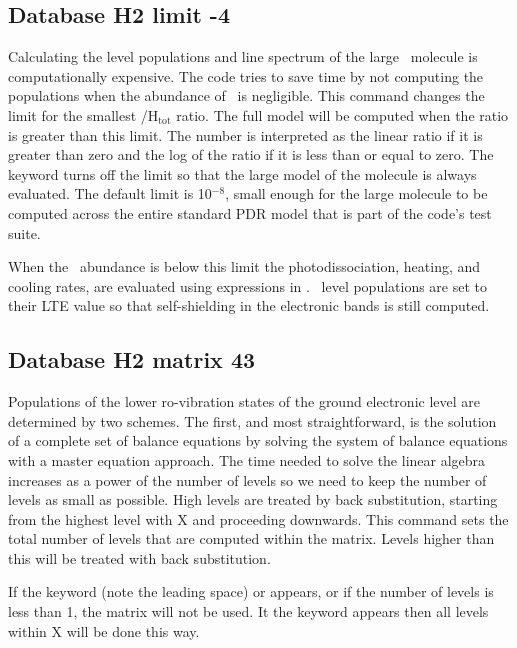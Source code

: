 \subsection{Database H2 limit -4  }

Calculating the level populations and line spectrum of the large \htwo\ molecule is computationally expensive.
The code tries to save time by not
computing the populations when the abundance of \htwo\ is negligible.  This
command changes the limit for the smallest \htwo/H$_{\mathrm{tot}}$ ratio.
The full model
will be computed when the ratio is greater than this limit.
The number
is interpreted as the linear ratio if it is greater than zero and the log
of the ratio if it is less than or equal to zero.
The keyword
 turns
off the limit so that the large model of the molecule is always evaluated.
The default limit is 10$^{-8}$, small enough for the large molecule to be
computed across the entire \citet{Tielens1985a} standard PDR
model that is part of the code's test suite.

When the \htwo\ abundance is below this limit the photodissociation,
heating, and cooling rates, are evaluated using expressions in
\citet{Tielens1985a}.
\htwo\ level populations are set to their LTE value so that
self-shielding in the electronic bands is still computed.

\subsection{Database H2 matrix 43}

Populations of the lower ro-vibration states of the ground electronic
level are determined by two schemes.
The first, and most straightforward,
is the solution of a complete set of balance equations by solving
the system
of balance equations with a master equation approach.
The time needed to solve the linear
algebra increases as a power of the number of levels
so we need to keep
the number of levels as small as possible.
High levels are treated by back
substitution, starting from the highest level with X and proceeding
downwards.
This command sets the total number of levels that are computed
within the matrix.
Levels higher than this will be treated with back
substitution.

If the keyword  (note the leading space) or
 appears, or if the
number of levels is less than 1, the matrix will not be used.
It the keyword
 appears then all levels within X will be done this way.

